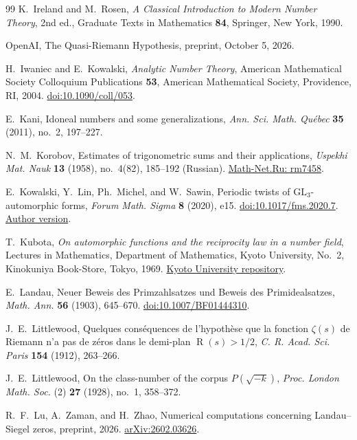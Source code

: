 \begin{thebibliography}{99}
K.~Ireland and M.~Rosen,
\emph{A Classical Introduction to Modern Number Theory}, 2nd ed.,
Graduate Texts in Mathematics \textbf{84}, Springer, New York, 1990.

OpenAI,
The Quasi-Riemann Hypothesis,
preprint, October 5, 2026.

H.~Iwaniec and E.~Kowalski,
\emph{Analytic Number Theory},
American Mathematical Society Colloquium Publications \textbf{53},
American Mathematical Society, Providence, RI, 2004.
\href{https://doi.org/10.1090/coll/053}{doi:10.1090/coll/053}.

E.~Kani,
Idoneal numbers and some generalizations,
\emph{Ann. Sci. Math. Qu\'ebec} \textbf{35} (2011), no.~2, 197--227.

N.~M.~Korobov,
Estimates of trigonometric sums and their applications,
\emph{Uspekhi Mat. Nauk} \textbf{13} (1958), no.~4(82),
185--192 (Russian).
\href{https://www.mathnet.ru/eng/rm7458}{Math-Net.Ru: rm7458}.

E.~Kowalski, Y.~Lin, Ph.~Michel, and W.~Sawin,
Periodic twists of $\mathrm{GL}_3$-automorphic forms,
\emph{Forum Math. Sigma} \textbf{8} (2020), e15.
\href{https://doi.org/10.1017/fms.2020.7}{doi:10.1017/fms.2020.7}.
\href{https://people.math.ethz.ch/~kowalski/gl3-twists.pdf}{Author version}.

T.~Kubota,
\emph{On automorphic functions and the reciprocity law in a number field},
Lectures in Mathematics, Department of Mathematics, Kyoto University,
No.~2, Kinokuniya Book-Store, Tokyo, 1969.
\href{https://hdl.handle.net/2433/84907}{Kyoto University repository}.

E.~Landau,
Neuer Beweis des Primzahlsatzes und Beweis des Primidealsatzes,
\emph{Math. Ann.} \textbf{56} (1903), 645--670.
\href{https://doi.org/10.1007/BF01444310}{doi:10.1007/BF01444310}.

J.~E.~Littlewood,
Quelques cons\'equences de l'hypoth\`ese que la fonction $\zeta(s)$ de
Riemann n'a pas de z\'eros dans le demi-plan $\operatorname{R}(s)>1/2$,
\emph{C. R. Acad. Sci. Paris} \textbf{154} (1912), 263--266.

J.~E.~Littlewood,
On the class-number of the corpus $P(\sqrt{-k})$,
\emph{Proc. London Math. Soc.} (2) \textbf{27} (1928),
no.~1, 358--372.

R.~F.~Lu, A.~Zaman, and H.~Zhao,
Numerical computations concerning Landau--Siegel zeros,
preprint, 2026.
\href{https://arxiv.org/abs/2602.03626}{arXiv:2602.03626}.


\end{thebibliography}
